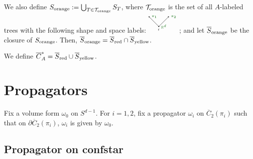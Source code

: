 \documentclass[11pt]{article}
\theoremstyle{definition}
\theoremstyle{remark}
\def\ov#1{\overline{#1}}
\def\sred{{\textnormal{red}}}
\def\syellow{{\textnormal{yellow}}}
\def\sorange{{\textnormal{orange}}}
\def\R{\mathbb{R}}
\def\cT{\mathcal{T}}
\begin{document}
We also define
${S}_\sorange:=\bigcup_{T\in\cT_\sorange}S_T$, where $\cT_\sorange$ is the set of all $A$-labeled trees with the following shape and space labels: 
$\begin{tikzpicture}
\node [below] at (0,0) {\tiny{r}};  
\node [right, black!60!green] at (0,0) {\tiny{$\R^d$}};
\node [right, black!60!green] at (-0.5,0.5) {\tiny{$\pi_1$}};
\node [right, black!60!green] at (0.5,0.5) {\tiny{$\pi_2$}};
\draw [fill] (0,0) circle [radius=0.02];
\draw [fill] (-0.5,0.5) circle [radius=0.02];
\draw [fill] (0.5,0.5) circle [radius=0.02];
\draw (-0.5,0.5) -- (0,0) -- (0.5,0.5);
\end{tikzpicture}$;
and let $\ov{S}_\sorange$ be the closure of $S_\sorange$. Then, $\ov{S}_\sorange=\ov{S}_\sred\cap\ov{S}_\syellow$. 

We define $\ov{C}^*_A=\ov{S}_\sred\cup\ov{S}_\syellow$.


\section{Propagators}

Fix a volume form $\omega_0$ on $S^{d-1}$. 
For $i=1,2$, fix a propagator $\omega_i$ on $\ov{C}_2(\pi_i)$ such that on $\partial\ov{C}_2(\pi_i)$, $\omega_i$ is given by $\omega_0$. 

\subsection{Propagator on confstar}
\end{document}
